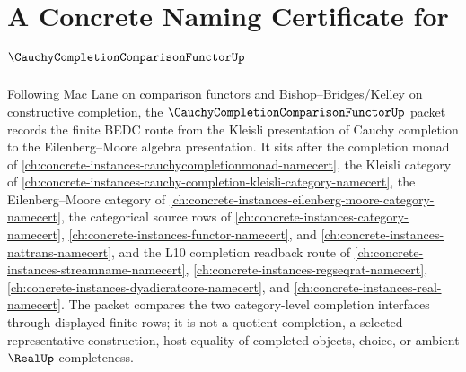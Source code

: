 \chapter{A Concrete Naming Certificate for $\CauchyCompletionComparisonFunctorUp$}
\label{ch:concrete-instances-cauchy-completion-comparison-functor-namecert}

Following Mac Lane on comparison functors and Bishop--Bridges/Kelley on constructive completion, the $\CauchyCompletionComparisonFunctorUp$ packet records the finite BEDC route from the Kleisli presentation of Cauchy completion to the Eilenberg--Moore algebra presentation. It sits after the completion monad of \autoref{ch:concrete-instances-cauchycompletionmonad-namecert}, the Kleisli category of \autoref{ch:concrete-instances-cauchy-completion-kleisli-category-namecert}, the Eilenberg--Moore category of \autoref{ch:concrete-instances-eilenberg-moore-category-namecert}, the categorical source rows of \autoref{ch:concrete-instances-category-namecert}, \autoref{ch:concrete-instances-functor-namecert}, and \autoref{ch:concrete-instances-nattrans-namecert}, and the L10 completion readback route of \autoref{ch:concrete-instances-streamname-namecert}, \autoref{ch:concrete-instances-regseqrat-namecert}, \autoref{ch:concrete-instances-dyadicratcore-namecert}, and \autoref{ch:concrete-instances-real-namecert}. The packet compares the two category-level completion interfaces through displayed finite rows; it is not a quotient completion, a selected representative construction, host equality of completed objects, choice, or ambient $\RealUp$ completeness.

